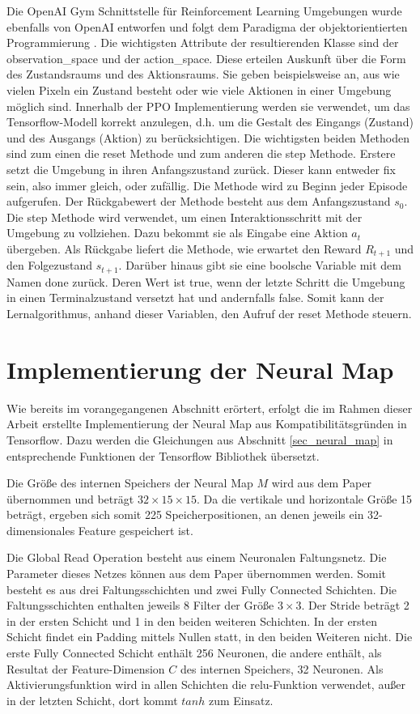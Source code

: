 Die OpenAI Gym Schnittstelle für Reinforcement Learning Umgebungen wurde ebenfalls von OpenAI entworfen und folgt dem Paradigma der objektorientierten Programmierung \cite{Gym}. Die wichtigsten Attribute der resultierenden Klasse sind der observation\_space und der action\_space. Diese erteilen Auskunft über die Form des Zustandsraums und des Aktionsraums. Sie geben beispielsweise an, aus wie vielen Pixeln ein Zustand besteht oder wie viele Aktionen in einer Umgebung möglich sind. Innerhalb der PPO Implementierung werden sie verwendet, um das Tensorflow-Modell korrekt anzulegen, d.h. um die Gestalt des Eingangs (Zustand) und des Ausgangs (Aktion) zu berücksichtigen. Die wichtigsten beiden Methoden sind zum einen die reset Methode und zum anderen die step Methode. Erstere setzt die Umgebung in ihren Anfangszustand zurück. Dieser kann entweder fix sein, also immer gleich, oder zufällig. Die Methode wird zu Beginn jeder Episode aufgerufen. Der Rückgabewert der Methode besteht aus dem Anfangszustand $s_0$. Die step Methode wird verwendet, um einen Interaktionsschritt mit der Umgebung zu vollziehen. Dazu bekommt sie als Eingabe eine Aktion $a_t$ übergeben. Als Rückgabe liefert die Methode, wie erwartet den Reward $R_{t+1}$ und den Folgezustand $s_{t+1}$. Darüber hinaus gibt sie eine boolsche Variable mit dem Namen done zurück. Deren Wert ist true, wenn der letzte Schritt die Umgebung in einen Terminalzustand versetzt hat und andernfalls false. Somit kann der Lernalgorithmus, anhand dieser Variablen, den Aufruf der reset Methode steuern.


\section{Implementierung der Neural Map}
\label{sec_nm_impl}

Wie bereits im vorangegangenen Abschnitt erörtert, erfolgt die im Rahmen dieser Arbeit erstellte Implementierung der Neural Map aus Kompatibilitätsgründen in Tensorflow. Dazu werden die Gleichungen aus Abschnitt \ref{sec_neural_map} in entsprechende Funktionen der Tensorflow Bibliothek übersetzt.

Die Größe des internen Speichers der Neural Map $M$ wird aus dem Paper übernommen und beträgt $32 \times 15 \times 15$. Da die vertikale und horizontale Größe 15 beträgt, ergeben sich somit 225 Speicherpositionen, an denen jeweils ein 32-dimensionales Feature gespeichert ist.

Die Global Read Operation besteht aus einem Neuronalen Faltungsnetz. Die Parameter dieses Netzes können aus dem Paper übernommen werden. Somit besteht es aus drei Faltungsschichten und zwei Fully Connected Schichten. Die Faltungsschichten enthalten jeweils 8 Filter der Größe $3 \times 3$. Der Stride beträgt 2 in der ersten Schicht und 1 in den beiden weiteren Schichten. In der ersten Schicht findet ein Padding mittels Nullen statt, in den beiden Weiteren nicht. Die erste Fully Connected Schicht enthält 256 Neuronen, die andere enthält, als Resultat der Feature-Dimension $C$ des internen Speichers, 32 Neuronen. Als Aktivierungsfunktion wird in allen Schichten die relu-Funktion verwendet, außer in der letzten Schicht, dort kommt $tanh$ zum Einsatz.

